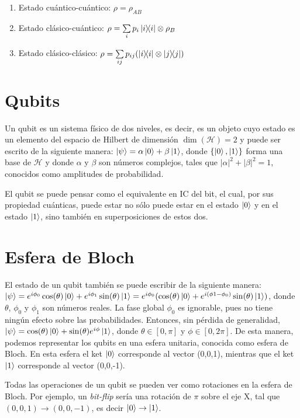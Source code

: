 \begin{enumerate}
    \item Estado cuántico-cuántico: $\rho = \rho_{AB}$
    \item Estado clásico-cuántico: $\rho = \sum\limits_{i} p_{i} \ketbra{i} \otimes \rho_{B}$
    \item Estado clásico-clásico: $\rho = \sum\limits_{ij} p_{ij} (\ketbra{i} \otimes \ketbra{j})$
\end{enumerate}

\section{Qubits}
Un qubit es un sistema físico de dos niveles, es decir, es un objeto cuyo estado es un elemento del espacio de Hilbert de dimensión $\dim (\mathcal{H})=2$ y puede ser escrito de la siguiente manera: $ \ket{\psi} = \alpha \ket{0} + \beta \ket{1} $, donde $ \{ \ket{0},\ket{1} \} $ forma una base de $\mathcal{H}$ y donde $ \alpha $ y $ \beta $ son números complejos, tales que $ | \alpha |^2 + | \beta |^2 = 1 $, conocidos como amplitudes de probabilidad.

El qubit se puede pensar como el equivalente en IC del bit, el cual, por sus propiedad cuánticas, puede estar no sólo puede estar en el estado $\ket{0}$ y en el estado $\ket{1}$, sino también en superposiciones de estos dos.

\section{Esfera de Bloch}

El estado de un qubit también se puede escribir de la siguiente manera: $ \ket{\psi} = e^{i \phi_0} \cos ( \theta ) \ket{0} + e^{i \phi_1} \sin ( \theta ) \ket{1}  = e^{i \phi_0} (\cos ( \theta ) \ket{0} + e^{i ( \phi1 - \phi_0 )} \sin ( \theta ) \ket{1}) $, donde $ \theta $, $\phi_0$ y $\phi_1$ son números reales. La fase global $\phi_0$ es ignorable, pues no tiene ningún efecto sobre las probabilidades. Entonces, sin pérdida de generalidad, $ \ket{\psi} = \cos ( \theta ) \ket{0} + \sin ( \theta ) e^{i \phi} \ket{1} $, donde $ \theta \in [0, \pi ] $ y $ \phi \in [0, 2 \pi ] $. De esta manera, podemos representar los qubits en una esfera unitaria, conocida como esfera de Bloch. En esta esfera el ket $\ket{0}$ corresponde al vector (0,0,1), mientras que el ket $\ket{1}$ corresponde al vector (0,0,-1).

Todas las operaciones de un qubit se pueden ver como rotaciones en la esfera de Bloch. Por ejemplo, un \textit{bit-flip} sería una rotación de $\pi$ sobre el eje X, tal que $(0,0,1) \rightarrow (0,0,-1)$, es decir $\ket{0} \rightarrow \ket{1}$.

